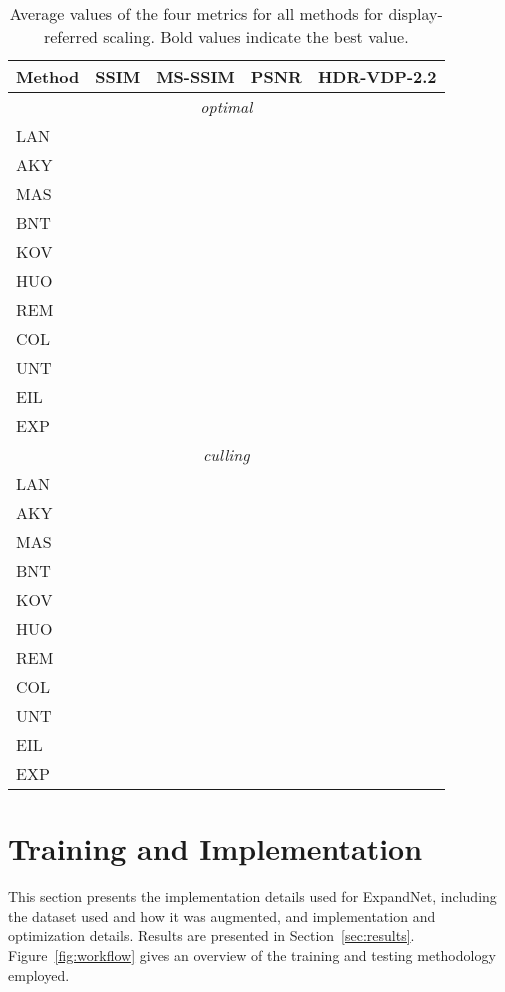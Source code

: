 \documentclass{egpubl}
\newcommand\la[1]{\multicolumn{1}{l}{#1}}
\begin{document}
\begin{table}[tbp]
    \caption{Average values of the four metrics for all methods for
    display-referred scaling. Bold values indicate the best
    value.}\label{table:resultsdisplay}
    \centering
    \begin{tabular}{lcccc}
        \toprule
        \la{{Method}}&SSIM&MS-SSIM&PSNR&HDR-VDP-2.2\\\midrule
\multicolumn{5}{c}{\textit{optimal}} \\\midrule
        \la{LAN}&&&&\\
        \la{AKY}&&&&\\
        \la{MAS}&&&&\\
        \la{BNT}&&&&\\
        \la{KOV}&&&&\\
        \la{HUO}&&&&\\
        \la{REM}&&&&\\
        \la{COL}&&&&\\
        \la{UNT}&&&&\\
        \la{EIL}&&&&\\
        \la{EXP}&&&&\\\midrule
\multicolumn{5}{c}{\textit{culling}} \\\midrule
        \la{LAN}&&&&\\
        \la{AKY}&&&&\\
        \la{MAS}&&&&\\
        \la{BNT}&&&&\\
        \la{KOV}&&&&\\
        \la{HUO}&&&&\\
        \la{REM}&&&&\\
        \la{COL}&&&&\\
        \la{UNT}&&&&\\
        \la{EIL}&&&&\\
        \la{EXP}&&&&\\
        \bottomrule
    \end{tabular}
\end{table}

\section{Training and Implementation}

This section presents the implementation details used for ExpandNet, including
the dataset used and how it was augmented, and implementation and optimization
details. Results are presented in Section~\ref{sec:results}.
Figure~\ref{fig:workflow} gives an overview of the training and testing
methodology employed.
\end{document}
